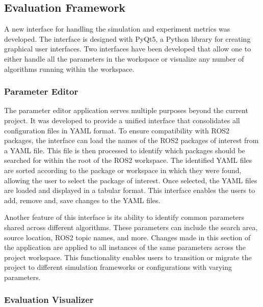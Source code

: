 \documentclass[../report.tex]{subfiles}
\begin{document}

    \subsection{Evaluation Framework}

    A new interface for handling the simulation and experiment metrics was developed. The interface is designed with PyQt5, a Python library for creating graphical user interfaces. 
    Two interfaces have been developed that allow one to either handle all the parameters in the workspace or visualize any number of algorithms running within the workspace.
        
    \subsubsection{Parameter Editor}
    The parameter editor application serves multiple purposes beyond the current project. It was developed to provide a unified interface that consolidates all configuration files in YAML format. 
    To ensure compatibility with ROS2 packages, the interface can load the names of the ROS2 packages of interest from a YAML file. This file is then processed to identify which packages should be
     searched for within the root of the ROS2 workspace. The identified YAML files are sorted according to the package or workspace in which they were found, allowing the user to select the 
     package of interest. Once selected, the YAML files are loaded and displayed in a tabular format. This interface enables the users to add, remove and, save changes to the YAML files.  

    Another feature of this interface is its ability to identify common parameters shared across different algorithms. These parameters can include the search area, source location, ROS2 
    topic names, and more. Changes made in this section of the application are applied to all instances of the same parameters across the project workspace. This functionality enables users 
    to transition or migrate the project to different simulation frameworks or configurations with varying parameters.

    \subsubsection{Evaluation Visualizer}
\end{document}
